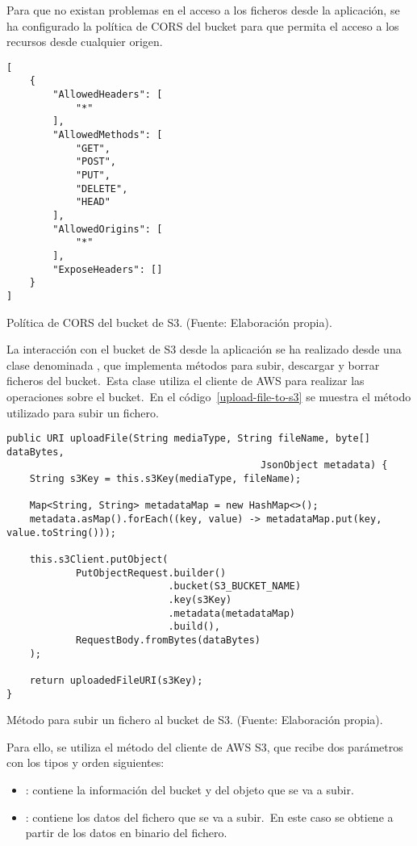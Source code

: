 Para que no existan problemas en el acceso a los ficheros desde la aplicación, se ha configurado la política de CORS
del bucket para que permita el acceso a los recursos desde cualquier origen.

\begin{codeBlock}
	\begin{verbatim}
[
	{
		"AllowedHeaders": [
			"*"
		],
		"AllowedMethods": [
			"GET",
			"POST",
			"PUT",
			"DELETE",
			"HEAD"
		],
		"AllowedOrigins": [
			"*"
		],
		"ExposeHeaders": []
	}
]
	\end{verbatim}
	\caption{Política de CORS del bucket de S3. (Fuente: Elaboración propia).}
\end{codeBlock}

La interacción con el bucket de S3 desde la aplicación se ha realizado desde una clase denominada , que
implementa métodos para subir, descargar y borrar ficheros del bucket.\ Esta clase utiliza el cliente de AWS
para realizar las operaciones sobre el bucket.\ En el código~\ref{upload-file-to-s3} se muestra el método utilizado
para subir un fichero.

\begin{codeBlock}
	\begin{verbatim}
public URI uploadFile(String mediaType, String fileName, byte[] dataBytes,
											JsonObject metadata) {
	String s3Key = this.s3Key(mediaType, fileName);

	Map<String, String> metadataMap = new HashMap<>();
	metadata.asMap().forEach((key, value) -> metadataMap.put(key, value.toString()));

	this.s3Client.putObject(
			PutObjectRequest.builder()
			                .bucket(S3_BUCKET_NAME)
			                .key(s3Key)
			                .metadata(metadataMap)
			                .build(),
			RequestBody.fromBytes(dataBytes)
	);

	return uploadedFileURI(s3Key);
}
	\end{verbatim}
	\caption{Método para subir un fichero al bucket de S3. (Fuente: Elaboración propia).}
	\label{upload-file-to-s3}
\end{codeBlock}

Para ello, se utiliza el método  del cliente de AWS S3, que recibe dos parámetros con los tipos y
orden siguientes:

\begin{itemize}
	\item {}: contiene la información del bucket y del objeto que se va a subir.
	\item {}: contiene los datos del fichero que se va a subir.\ En este caso se obtiene
	a partir de los datos en binario del fichero.
\end{itemize}

